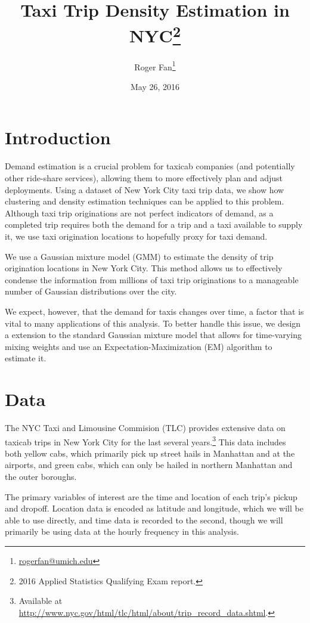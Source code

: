 \documentclass[12pt]{article}
\theoremstyle{definition}
\theoremstyle{algodesc}
\begin{document}
\title{Taxi Trip Density Estimation in NYC\thanks{2016 Applied Statistics Qualifying Exam report.}}
\author{
    Roger Fan\footnote{\url{rogerfan@umich.edu}}
}
\date{May 26, 2016}

\maketitle


\section{Introduction}
Demand estimation is a crucial problem for taxicab companies (and potentially other ride-share services), allowing them to more effectively plan and adjust deployments. Using a dataset of New York City taxi trip data, we show how clustering and density estimation techniques can be applied to this problem. Although taxi trip originations are not perfect indicators of demand, as a completed trip requires both the demand for a trip and a taxi available to supply it, we use taxi origination locations to hopefully proxy for taxi demand.

We use a Gaussian mixture model (GMM) to estimate the density of trip origination locations in New York City. This method allows us to effectively condense the information from millions of taxi trip originations to a manageable number of Gaussian distributions over the city.

We expect, however, that the demand for taxis changes over time, a factor that is vital to many applications of this analysis. To better handle this issue, we design a extension to the standard Gaussian mixture model that allows for time-varying mixing weights and use an Expectation-Maximization (EM) algorithm to estimate it.


\section{Data}
The NYC Taxi and Limousine Commision (TLC) provides extensive data on taxicab trips in New York City for the last several years.\footnote{Available at \url{http://www.nyc.gov/html/tlc/html/about/trip_record_data.shtml}.} This data includes both yellow cabs, which primarily pick up street hails in Manhattan and at the airports, and green cabs, which can only be hailed in northern Manhattan and the outer boroughs.

The primary variables of interest are the time and location of each trip's pickup and dropoff. Location data is encoded as latitude and longitude, which we will be able to use directly, and time data is recorded to the second, though we will primarily be using data at the hourly frequency in this analysis.
\end{document}
